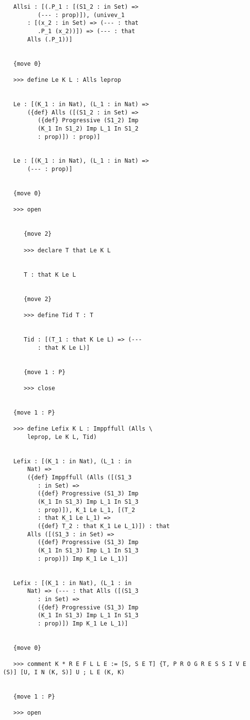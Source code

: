 \documentclass{article}
\begin{document}
\begin{verbatim}
   Allsi : [(.P_1 : [(S1_2 : in Set) => 
          (--- : prop)]), (univev_1 
       : [(x_2 : in Set) => (--- : that 
          .P_1 (x_2))]) => (--- : that 
       Alls (.P_1))]


   {move 0}

   >>> define Le K L : Alls leprop


   Le : [(K_1 : in Nat), (L_1 : in Nat) => 
       ({def} Alls ([(S1_2 : in Set) => 
          ({def} Progressive (S1_2) Imp 
          (K_1 In S1_2) Imp L_1 In S1_2 
          : prop)]) : prop)]


   Le : [(K_1 : in Nat), (L_1 : in Nat) => 
       (--- : prop)]


   {move 0}

   >>> open


      {move 2}

      >>> declare T that Le K L


      T : that K Le L


      {move 2}

      >>> define Tid T : T


      Tid : [(T_1 : that K Le L) => (--- 
          : that K Le L)]


      {move 1 : P}

      >>> close


   {move 1 : P}

   >>> define Lefix K L : Imppffull (Alls \
       leprop, Le K L, Tid)


   Lefix : [(K_1 : in Nat), (L_1 : in 
       Nat) => 
       ({def} Imppffull (Alls ([(S1_3 
          : in Set) => 
          ({def} Progressive (S1_3) Imp 
          (K_1 In S1_3) Imp L_1 In S1_3 
          : prop)]), K_1 Le L_1, [(T_2 
          : that K_1 Le L_1) => 
          ({def} T_2 : that K_1 Le L_1)]) : that 
       Alls ([(S1_3 : in Set) => 
          ({def} Progressive (S1_3) Imp 
          (K_1 In S1_3) Imp L_1 In S1_3 
          : prop)]) Imp K_1 Le L_1)]


   Lefix : [(K_1 : in Nat), (L_1 : in 
       Nat) => (--- : that Alls ([(S1_3 
          : in Set) => 
          ({def} Progressive (S1_3) Imp 
          (K_1 In S1_3) Imp L_1 In S1_3 
          : prop)]) Imp K_1 Le L_1)]


   {move 0}

   >>> comment K * R E F L L E := [S, S E T] {T, P R O G R E S S I V E (S)] [U, I N (K, S)] U ; L E (K, K)


   {move 1 : P}

   >>> open



\end{verbatim}
\end{document}
